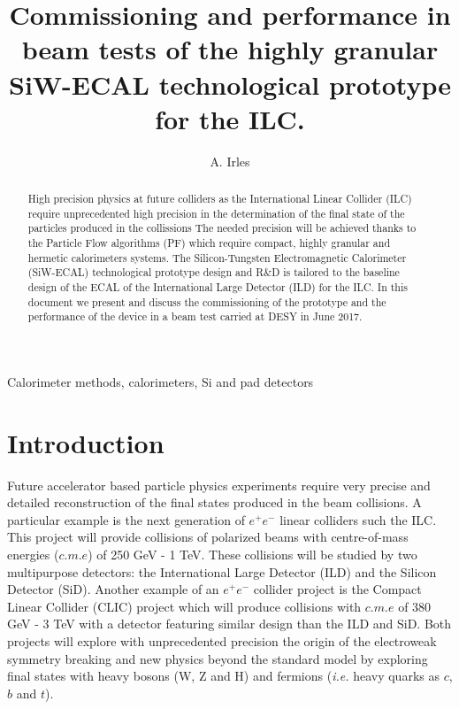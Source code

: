 \documentclass[final,3p,times,twocolumn]{elsarticle}
\begin{document}
\begin{frontmatter}
  \title{Commissioning and performance in beam tests of the highly granular SiW-ECAL technological prototype for the ILC.}
  
\author{A. Irles}


\begin{keyword}
  Calorimeter methods, calorimeters, Si and pad detectors
\end{keyword}



\begin{abstract}
  High precision physics at future colliders as the International Linear Collider (ILC) require unprecedented high precision in the determination
  of the final state of the particles produced in the collissions
  The needed precision will be achieved thanks to the Particle Flow algorithms (PF) which require compact, highly granular and hermetic calorimeters systems.
  The Silicon-Tungsten Electromagnetic Calorimeter (SiW-ECAL) technological prototype
  design and R\&D is tailored to the baseline design of the ECAL of the International Large Detector (ILD) for the ILC.
  In this document we present and discuss the commissioning of the prototype
  and the performance of the device in a beam test carried at DESY in June 2017.
\end{abstract}

  \end{frontmatter}
\linenumbers

\section{Introduction}

Future accelerator based particle physics experiments
require very precise and detailed reconstruction of the final states produced
in the beam collisions. A particular example is the next generation of $e^{+}e^{-}$
linear colliders such the ILC\cite{Behnke:2013xla,Baer:2013cma,Adolphsen:2013jya,Adolphsen:2013kya,Behnke:2013lya}.
This project will provide collisions of polarized beams with centre-of-mass energies ($c.m.e$) of 250 GeV - 1 TeV.
These collisions will be studied by two multipurpose detectors:
the International Large Detector (ILD) and the Silicon Detector (SiD)\cite{Behnke:2013lya}.
Another example of an $e^{+}e^{-}$ collider project is the Compact Linear Collider (CLIC)
project\cite{Aicheler:2012bya,Linssen:2012hp,Lebrun:2012hj}
which will produce collisions with $c.m.e$ of 380 GeV - 3 TeV
with a detector featuring similar design than the ILD and SiD.
Both projects will explore with unprecedented precision the origin of the electroweak symmetry breaking and new physics beyond the standard model by exploring final states with heavy bosons (W, Z  and H) and fermions ({\it i.e.} heavy quarks as $c$, $b$ and $t$).
\end{document}
